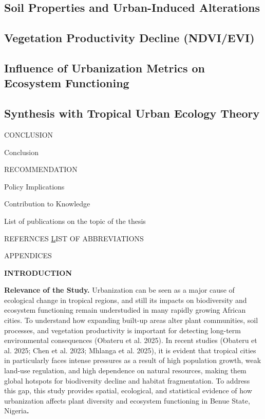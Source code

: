 \subsection{Soil Properties and Urban-Induced Alterations}
\label{subsection:3-8-3}
\subsection{Vegetation Productivity Decline (NDVI/EVI)}
\label{subsection:3-8-4}
\subsection{Influence of Urbanization Metrics on Ecosystem Functioning}
\label{subsection:3-8-5}
\subsection{Synthesis with Tropical Urban Ecology Theory}
\label{subsection:3-8-6}

CONCLUSION 

Conclusion 

RECOMMENDATION 

Policy Implications 

Contribution to Knowledge 

List of publications on the topic of the thesis 

REFERNCES \protect\hyperlink{_Toc215220540{110}}

LIST OF ABBREVIATIONS 

APPENDICES 

{}\textbf{INTRODUCTION}

\textbf{Relevance of the Study.} Urbanization can be seen as a major cause of ecological change in tropical regions, and still its impacts on biodiversity and ecosystem functioning remain understudied in many rapidly growing African cities. To understand how expanding built-up areas alter plant communities, soil processes, and vegetation productivity is important for detecting long-term environmental consequences (Obateru et al. 2025). In recent studies (Obateru et al. 2025; Chen et al. 2023; Mhlanga et al. 2025), it is evident that tropical cities in particularly faces intense pressures as a result of high population growth, weak land-use regulation, and high dependence on natural resources, making them global hotspots for biodiversity decline and habitat fragmentation. To address this gap, this study provides spatial, ecological, and statistical evidence of how urbanization affects plant diversity and ecosystem functioning in Benue State, Nigeria\textbf{.}


